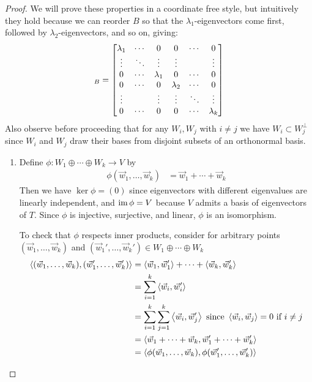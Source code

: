 \begin{proof}
  We will prove these properties in a coordinate free style, but intuitively they hold because we can
  reorder $B$ so that the $\lambda_1$-eigenvectors come first, followed by $\lambda_2$-eigenvectors, and so on, giving:
    \begin{align}
      [T]_B = \bmatr{
        \lambda_1 & \cdots & 0 & 0 & \cdots & 0 \\
        \vdots & \ddots & \vdots & \vdots & & \vdots \\
        0 & \cdots & \lambda_1 & 0 & \cdots & 0 \\
        0 & \cdots & 0 & \lambda_2 & \cdots & 0 \\
        \vdots &  & \vdots & \vdots & \ddots & \vdots \\
        0 & \cdots & 0 & 0 & \cdots & \lambda_k
      }
    \end{align}
  Also observe before proceeding that for any $W_i, W_j$ with $i \ne j$ we have $W_i \subset W_j^\perp$
  since $W_i$ and $W_j$ draw their bases from disjoint subsets of an orthonormal basis.
  \begin{enumerate}[(1)]
    \item Define $\phi : W_1 \oplus \cdots \oplus W_k \to V$ by
        \begin{align}
          \phi(\vec w_1,\ldots,\vec w_k) &= \vec w_1 + \cdots + \vec w_k
        \end{align}
      Then we have $\ker \phi = (0)$ since eigenvectors with different eigenvalues are linearly independent,
      and $\operatorname{im} \phi = V$ because $V$ admits a basis of eigenvectors of $T$. Since $\phi$ is injective, surjective,
      and linear, $\phi$ is an isomorphism.

      To check that $\phi$ respects inner products, consider for arbitrary points $(\vec w_1,\ldots,\vec w_k)$ and
      $(\vec w_1',\ldots,\vec w_k') \in W_1 \oplus \cdots \oplus W_k$
        \begin{align}
          \left\langle (\vec w_1,\ldots,\vec w_k) , (\vec w_1',\ldots,\vec w_k') \right\rangle
            &= \left\langle \vec w_1 , \vec w_1' \right\rangle + \cdots + \left\langle \vec w_k , \vec w_k' \right\rangle \\
            &= \sum_{i=1}^k\left\langle \vec w_i , \vec w_i' \right\rangle \\
            &= \sum_{i=1}^k\sum_{j=1}^k\left\langle \vec w_i , \vec w_j' \right\rangle \text{ since } \left\langle \vec w_i , \vec w_j \right\rangle = 0 \text{ if } i \ne j\\
            &= \left\langle \vec w_1 + \cdots + \vec w_k , \vec w_1' + \cdots + \vec w_k' \right\rangle\\
            &= \left\langle \phi(\vec w_1,\ldots,\vec w_k) , \phi(\vec w_1',\ldots,\vec w_k') \right\rangle
        \end{align}


\end{enumerate}
\end{proof}

